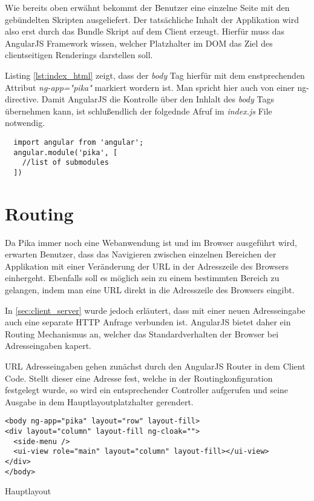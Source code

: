 Wie bereits oben erwähnt bekommt der Benutzer eine einzelne Seite mit den gebündelten Skripten ausgeliefert. Der tatsächliche Inhalt der Applikation wird also erst durch das Bundle Skript auf dem Client erzeugt. Hierfür muss das AngularJS Framework wissen, welcher Platzhalter im DOM das Ziel des clientseitigen Renderings darstellen soll.  

Listing \ref{lst:index_html} zeigt, dass der \textit{body} Tag hierfür mit dem enstprechenden Attribut \textit{ng-app="pika"} markiert wordern ist. Man spricht hier auch von einer \gls{ng-directive}. Damit AngularJS die Kontrolle über den Inhlalt des \textit{body} Tags übernehmen kann, ist schlußendlich der folgednde Afruf im \textit{index.js} File notwendig. 

\begin{listing}[H]
\begin{verbatim}
  import angular from 'angular';
  angular.module('pika', [ 
    //list of submodules 
  ])
\end{verbatim}
\end{listing}

\section{Routing}
\label{sec:routing}

Da Pika immer noch eine Webanwendung ist und im Browser ausgeführt wird, erwarten Benutzer, dass das Navigieren zwischen einzelnen Bereichen der Applikation mit einer Veränderung der URL in der Adresszeile des Browsers einhergeht. Ebenfalls soll es möglich sein zu einem bestimmten Bereich zu gelangen, indem man eine URL direkt in die Adresszeile des Browsers eingibt.

In \ref{sec:client_server} wurde jedoch erläutert, dass mit einer neuen Adresseingabe auch eine separate HTTP Anfrage verbunden ist. AngularJS bietet daher ein Routing Mechanismus an, welcher das Standardverhalten der Browser bei Adresseingaben kapert. 

URL Adresseingaben gehen zunächst durch den AngularJS Router in dem Client Code. Stellt dieser eine Adresse fest, welche in der Routingkonfiguration festgelegt wurde, so wird ein entsprechender Controller aufgerufen und seine Ausgabe in dem Hauptlayoutplatzhalter gerendert. 


\begin{listing}[H]
\begin{verbatim}
<body ng-app="pika" layout="row" layout-fill>
<div layout="column" layout-fill ng-cloak="">
  <side-menu />
  <ui-view role="main" layout="column" layout-fill></ui-view>
</div>
</body>
\end{verbatim}
\caption{Hauptlayout}
\label{lst:main_layout}
\end{listing}

